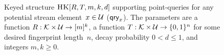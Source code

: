 \begin{figure}[thp]
\begin{pchstack}[boxed,center,space=0.5em]
		\begin{pcvstack}[space=0.45em]
            \procedure[linenumbering, headlinecmd={\vspace{.1em}\hrule\vspace{.2em}}]{$\Up_{K}(A,\up_x)$}{%
                (p_1,\ldots,p_k) \gets R(K,x) \\
                \mathrm{fp}_{x} \gets T(K,x)\\
                \pcfor i \in [k]\\
                \t{\pcif} A[i][p_i].\fp \, {\not\in} \{\fp_x, {\star}\} \\
                \t \t r \getsr \left[0,1\right)\\
                \t \t \pcif r \leq d^{A[i][p_i].\cnt}\\
                \t\t\t A[i][p_i].\cnt \,{-}{=}\, 1 \\%
                \pcgraycomment{overtake the counter if $0$} \\ %
                \t\pcif  A[i][p_i].\cnt = 0 \\
                \t\t A[i][p_i].\fp  \gets \fp_x \\ %
                \pcgraycomment{increase the count if $\fp = \fp_x$} \\ %
                \t\pcif A[i][p_i].\fp = \fp_x \\
                \t\t A[i][p_i].\cnt \,{+}{=}\, 1 \\ %
                \pcreturn A 
            }
			\end{pcvstack}
    
    \end{pchstack}
\caption[The HeavyKeeper Structure.]{Keyed structure $\textnormal{\textsc{HK}}[R,T,m,k,d]$ supporting point-queries for any potential stream element~$x\in\mathcal{U}$ ($\mathsf{qry}_x$). The parameters are a function $R: \mathcal{K}\times\mathcal{U} \to [m]^k$, a function $T: \mathcal{K}\times\mathcal{U} \to \{0,1\}^n$ for some desired fingerprint length~$n$, decay probability $0<d\leq1$, and integers $m,k\geq 0$.} 
\label{fig:hk}
\end{figure}
